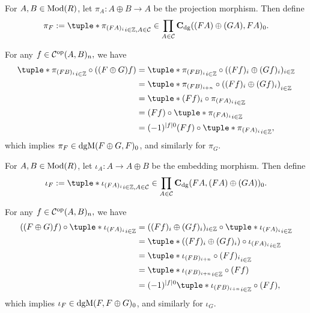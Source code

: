 \begin{remark}
    \label{rem:dgm_pi_iota}
    For \( A, B \in \operatorname{Mod}(R) \), let \( \pi_A: A \oplus B \to A \) be the projection morphism. Then define
    \[
        \pi_F := \tuple*{ \pi_{(F A)_i} }_{i \in \Zb, A \in \Cc} \in \prod_{A \in \Cc} \C_{\dg}((F A) \oplus (G A), F A)_0.
    \]

    For any \( f \in {\mathcal{C}}^{\operatorname{op}}(A, B)_n, \) we have
    \begin{align*}
        \tuple*{ \pi_{(F B)_i} }_{i \in \Zb} \circ ((F \oplus G) f) &= \tuple*{ \pi_{(F B)_i} }_{i \in \Zb} \circ ((F f)_i \oplus (G f)_i)_{i \in \Zb} \\
        &= \tuple*{ \pi_{(F B)_{i + n}} \circ ((F f)_i \oplus (G f)_i) }_{i \in \Zb} \\
        &= \tuple*{ (F f)_i \circ \pi_{(F A)_i} }_{i \in \Zb} \\
        &= (F f) \circ \tuple*{ \pi_{(F A)_i} }_{i \in \Zb} \\
        &= (-1)^{|f| 0}(F f) \circ \tuple*{ \pi_{(F A)_i} }_{i \in \Zb}, \\
    \end{align*}
    which implies \( \pi_F \in \operatorname{dgM}(F \oplus G, F)_0 \), and similarly for \( \pi_G \).

    For \( A, B \in \operatorname{Mod}(R) \), let \( \iota_A: A \to A \oplus B \) be the embedding morphism. Then define
    \[
        \iota_F := \tuple*{ \iota_{(F A)_i} }_{i \in \Zb, A \in \Cc} \in \prod_{A \in \Cc} \C_{\dg}(F A, (F A) \oplus (G A) )_0.
    \]

    For any \( f \in {\mathcal{C}}^{\operatorname{op}}(A, B)_n, \) we have
    \begin{align*}
        ((F \oplus G) f) \circ \tuple*{ \iota_{(F A)_i} }_{i \in \Zb} &= ((F f)_i \oplus (G f)_i)_{i \in \Zb} \circ \tuple*{ \iota_{(F A)_i} }_{i \in \Zb} \\
        &= \tuple*{ ((F f)_i \oplus (G f)_i) \circ \iota_{(F A)_i} }_{i \in \Zb} \\
        &= \tuple*{ \iota_{(F B)_{i + n}} \circ (F f)_i  }_{i \in \Zb} \\
        &= \tuple*{ \iota_{(F B)_{i + n}} }_{i \in \Zb} \circ (F f) \\
        &= (-1)^{|f| 0}\tuple*{ \iota_{(F B)_{i + n}} }_{i \in \Zb} \circ (F f), \\
    \end{align*}
    which implies \( \iota_F \in \operatorname{dgM}(F, F \oplus G)_0 \), and similarly for \( \iota_G \).


\end{remark}
